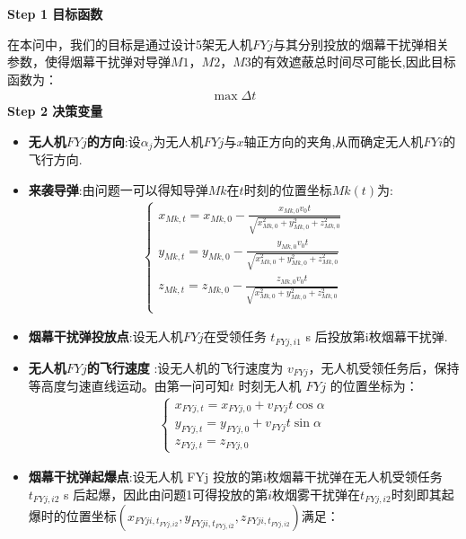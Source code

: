 \documentclass[../main.tex]{subfiles}
\begin{document}
\noindent \textbf{Step 1 目标函数}
\par 在本问中，我们的目标是通过设计5架无人机$FYj$与其分别投放的烟幕干扰弹相关参数，使得烟幕干扰弹对导弹$M1$，$M2$，$M3$的有效遮蔽总时间尽可能长,因此目标函数为：
\begin{align}\label{11.1}
  \max \Delta t
\end{align}
\noindent \textbf{Step 2 决策变量}

\begin{itemize}
\item \textbf{无人机$FYj$的方向}:设$\alpha_j$为无人机$FYj$与$x$轴正方向的夹角,从而确定无人机$FYi$的飞行方向.

\item \textbf{来袭导弹}:由问题一可以得知导弹$Mk$在$t$时刻的位置坐标$Mk\left( t \right)$为:
\begin{align}
	\left\{ \begin{array}{l}
	x_{Mk,t}=x_{Mk,0}-\frac{x_{Mk,0}v_0t}{\sqrt{x_{Mk,0}^{2}+y_{Mk,0}^{2}+z_{Mk,0}^{2}}}\\
	y_{Mk,t}=y_{Mk,0}-\frac{y_{Mk,0}v_0t}{\sqrt{x_{Mk,0}^{2}+y_{Mk,0}^{2}+z_{Mk,0}^{2}}}\\
	z_{Mk,t}=z_{Mk,0}-\frac{z_{Mk,0}v_0t}{\sqrt{x_{Mk,0}^{2}+y_{Mk,0}^{2}+z_{Mk,0}^{2}}}\\
\end{array} \right. 
\end{align}
\item \textbf{烟幕干扰弹投放点}:设无人机$FYj$在受领任务 \( t_{FYj,i1} \) s 后投放第i枚烟幕干扰弹.
\item  \textbf{无人机$FYj$的飞行速度} :设无人机的飞行速度为 \( v_{FYj} \)，无人机受领任务后，保持等高度匀速直线运动。由第一问可知\( t \) 时刻无人机 \( FYj \) 的位置坐标为：
\begin{align}\label{11.3}
  \begin{cases}
x_{FYj,t} = x_{FYj,0} + v_{FYj} t \cos\alpha \\
y_{FYj,t} = y_{FYj,0} + v_{FYj} t \sin\alpha \\
z_{FYj,t} = z_{FYj,0}
\end{cases}
\end{align}
\item \textbf{烟幕干扰弹起爆点}:设无人机 FYj 投放的第i枚烟幕干扰弹在无人机受领任务 \( t_{FYj,i2} \) s 后起爆，因此由问题1可得投放的第$i$枚烟雾干扰弹在$t_{FYj,i2}$时刻即其起爆时的位置坐标$\left( x_{FYji,t_{FYj,i2}},y_{FYji,t_{FYj,i2}},z_{FYji,t_{FYj,i2}} \right)$满足：
\begin{align}\label{19.4}

\end{align}
\end{itemize}
\end{document}
